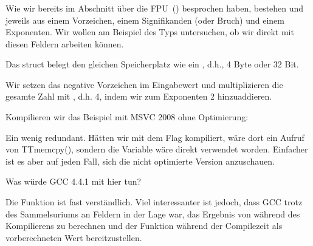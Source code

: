 \subsubsection{\WorkingWithFloatAsWithStructSubSubSectionName}
\label{sec:floatasstruct}
Wie wir bereits im Abschnitt über die FPU~() besprochen haben, bestehen \Tfloat und \Tdouble jeweils aus
einem Vorzeichen, einem Signifikanden (oder Bruch) und einem Exponenten.
Wir wollen am Beispiel des Typs \Tfloat untersuchen, ob wir direkt mit diesen Feldern arbeiten können.





Das struct  belegt den gleichen Speicherplatz wie ein \Tfloat, d.h., 4 Byte oder 32 Bit.

Wir setzen das negative Vorzeichen im Eingabewert und multiplizieren die gesamte Zahl mit , d.h. 4, indem wir
zum Exponenten 2 hinzuaddieren.

Kompilieren wir das Beispiel mit MSVC 2008 ohne Optimierung:


Ein wenig redundant.
Hätten wir mit dem Flag \Ox kompiliert, wäre dort ein Aufruf von TT{memcpy()}, sondern die Variable  wäre direkt
verwendet worden.
Einfacher ist es aber auf jeden Fall, sich die nicht optimierte Version anzuschauen.

Was würde GCC 4.4.1 mit \Othree hier tun?


Die Funktion \ttf ist fast verständlich. Viel interessanter ist jedoch, dass GCC trotz des Sammelsuriums an Feldern in
der Lage war, das Ergebnis von  während des Kompilierens zu berechnen und der Funktion \printf 
während der Compilezeit als vorberechneten Wert bereitzustellen.
